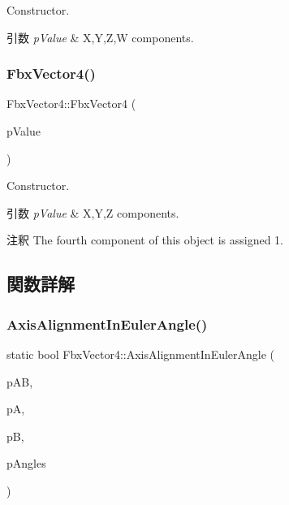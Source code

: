 Constructor. 
\begin{DoxyParams}{引数}
{\em p\+Value} & X,Y,Z,W components. \\
\hline
\end{DoxyParams}
\mbox{\label{class_fbx_vector4_a6f216a9046faeb73c5f54343d8be3374}} 
\subsubsection{\texorpdfstring{Fbx\+Vector4()}{FbxVector4()}\hspace{0.1cm}{\footnotesize\ttfamily [5/5]}}
{\footnotesize\ttfamily Fbx\+Vector4\+::\+Fbx\+Vector4 (\begin{DoxyParamCaption}\item[{const \hyperlink{fbxtypes_8h_ae0a96f14cde566774c7553aa7523b7a7}{Fbx\+Double3} \&}]{p\+Value }\end{DoxyParamCaption})}

Constructor. 
\begin{DoxyParams}{引数}
{\em p\+Value} & X,Y,Z components. \\
\hline
\end{DoxyParams}
\begin{DoxyRemark}{注釈}
The fourth component of this object is assigned 1. 
\end{DoxyRemark}


\subsection{関数詳解}
\mbox{\label{class_fbx_vector4_a4c3afde83799eb1ebd515d16d53ffd63}} 
\subsubsection{\texorpdfstring{Axis\+Alignment\+In\+Euler\+Angle()}{AxisAlignmentInEulerAngle()}}
{\footnotesize\ttfamily static bool Fbx\+Vector4\+::\+Axis\+Alignment\+In\+Euler\+Angle (\begin{DoxyParamCaption}\item[{const \hyperlink{class_fbx_vector4}{Fbx\+Vector4} \&}]{p\+AB,  }\item[{const \hyperlink{class_fbx_vector4}{Fbx\+Vector4} \&}]{pA,  }\item[{const \hyperlink{class_fbx_vector4}{Fbx\+Vector4} \&}]{pB,  }\item[{\hyperlink{class_fbx_vector4}{Fbx\+Vector4} \&}]{p\+Angles }\end{DoxyParamCaption})\hspace{0.3cm}{\ttfamily [static]}}

